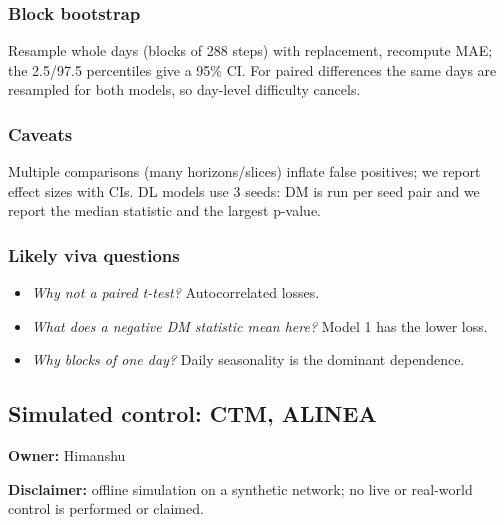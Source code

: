 \documentclass[10pt,a4paper]{article}
\begin{document}
\subsubsection*{Block bootstrap}
Resample whole days (blocks of 288 steps) with replacement, recompute MAE; the 2.5/\allowbreak{}97.5 percentiles give a 95\% CI. For paired differences the same days are resampled for both models, so day-level difficulty cancels.

\subsubsection*{Caveats}
Multiple comparisons (many horizons/\allowbreak{}slices) inflate false positives; we report effect sizes with CIs. DL models use 3 seeds: DM is run per seed pair and we report the median statistic and the largest p-value.

\subsubsection*{Likely viva questions}
\begin{itemize}[nosep,leftmargin=*]
\item \emph{Why not a paired t-test?} Autocorrelated losses.
\item \emph{What does a negative DM statistic mean here?} Model 1 has the lower loss.
\item \emph{Why blocks of one day?} Daily seasonality is the dominant dependence.
\end{itemize}

\subsection*{Simulated control: CTM, ALINEA}
\textbf{Owner:} Himanshu

\textbf{Disclaimer:} offline simulation on a synthetic network; no live or real-world control is performed or claimed.
\end{document}
